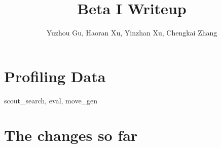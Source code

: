 \documentclass[10pt,twosidep]{article}
\begin{document}
\pagestyle{fancy}

\setlength{\parindent}{2em}
\setlength{\footskip}{30pt}
\setlength{\baselineskip}{1.3\baselineskip}

\title{Beta I Writeup}
\author{Yuzhou Gu, Haoran Xu, Yinzhan Xu, Chengkai Zhang}
\maketitle{}

\section{Profiling Data}

scout\_search, eval, move\_gen

\section{The changes so far}
\end{document}
